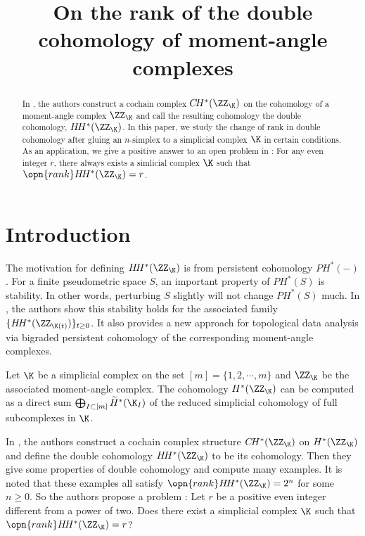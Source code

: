 
\title{On the rank of the double cohomology of moment-angle complexes}
\begin{abstract}
    In \cite{LPSS-2023}, the authors construct a cochain complex
    $C\!H^*(\ZZ_{\K})$ on the cohomology of a moment-angle complex $\ZZ_{\K}$
    and call the resulting cohomology the double cohomology,
    $H\!H^*(\ZZ_{\K})$. In this paper, we study the change of
    rank in double cohomology after gluing an $n$-simplex to
    a simplicial complex $\K$ in certain conditions. As an application,
    we give a positive answer to an open problem in \cite{LPSS-2023}:
    For any even integer $r$, there always
    exists a simlicial complex $\K$ such that 
    $\opn{rank} H\!H^*(\ZZ_{\K})=r$.
\end{abstract}
\maketitle


\section{Introduction}

The motivation for defining $H\!H^*(\ZZ_{\K})$ is from persistent cohomology
$P\!H^*(-)$. For a finite pseudometric space $S$, 
an important property of $P\!H^*(S)$ is stability. In other words, perturbing $S$ slightly will not change $P\!H^*(S)$ much. 
In \cite{BLPSS-2024}, the authors show this 
stability holds for the associated family 
$\{H\!H^*(\ZZ_{\K(t)})\}_{t\ge 0}$. It also provides a new
approach for topological data analysis
via bigraded persistent cohomology of the
corresponding moment-angle complexes.

Let $\K$ be a simplicial complex on the set $[m]=\{1,2,\cdots,m\}$
and $\ZZ_{\K}$ be the associated moment-angle complex. The cohomology 
$H^*(\ZZ_{\K})$ can be computed as a direct sum 
$\bigoplus_{I\subset [m]} \widetilde{H}^*(\K_I)$
of the reduced simplicial cohomology of full subcomplexes in $\K$.

In \cite{LPSS-2023}, the authors construct a cochain complex structure
$C\!H^*(\ZZ_{\K})$ on $H^*(\ZZ_{\K})$ and define the double cohomology
$H\!H^*(\ZZ_{\K})$ to be its cohomology. Then they give some properties 
of double cohomology and compute many examples. It is noted that
these examples all satisfy $\opn{rank} H\!H^*(\ZZ_{\K})=2^n$ for some
$n\ge 0$. So the authors propose a problem \cite[Question 8.9]{LPSS-2023}: Let $r$ be a positive even integer different from a power of two. Does there
exist a simplicial complex $\K$ such that 
$\opn{rank} H\!H^*(\ZZ_{\K})=r$? 

